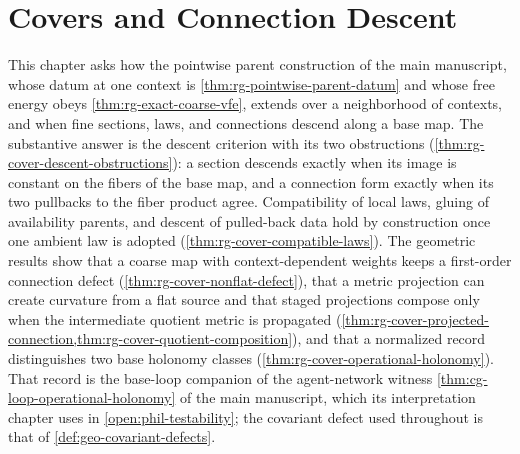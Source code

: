 \chapter{Covers and Connection Descent}
\label{ch:neighborhood-parents}

This chapter asks how the pointwise parent construction of the main manuscript,
whose datum at one context is \cref{thm:rg-pointwise-parent-datum} and whose free
energy obeys \cref{thm:rg-exact-coarse-vfe}, extends over a neighborhood of
contexts, and when fine sections, laws, and connections descend along a base map.
The substantive answer is the descent criterion with its two obstructions
(\cref{thm:rg-cover-descent-obstructions}): a section descends exactly when its
image is constant on the fibers of the base map, and a connection form exactly
when its two pullbacks to the fiber product agree. Compatibility of local laws,
gluing of availability parents, and descent of pulled-back data hold by
construction once one ambient law is adopted (\cref{thm:rg-cover-compatible-laws}).
The geometric results show that a coarse map with context-dependent weights
keeps a first-order connection defect (\cref{thm:rg-cover-nonflat-defect}), that
a metric projection can create curvature from a flat source and that staged
projections compose only when the intermediate quotient metric is propagated
(\cref{thm:rg-cover-projected-connection,thm:rg-cover-quotient-composition}),
and that a normalized record distinguishes two base holonomy classes
(\cref{thm:rg-cover-operational-holonomy}). That record is the base-loop
companion of the agent-network witness \cref{thm:cg-loop-operational-holonomy}
of the main manuscript, which its interpretation chapter uses in
\cref{open:phil-testability}; the covariant defect used throughout is that of
\cref{def:geo-covariant-defects}.


